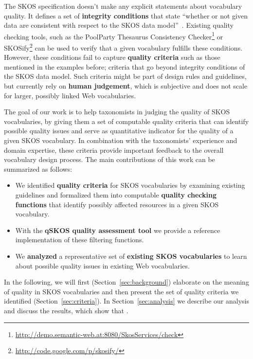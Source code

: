 
The SKOS specification doesn't make any explicit statements about vocabulary quality. It defines a set of \textbf{integrity conditions} that state ``whether or not given data are consistent with respect to the SKOS data model''~\cite{Miles2005}. Existing quality checking tools, such as the PoolParty Thesaurus Consistency Checker\footnote{\url{http://demo.semantic-web.at:8080/SkosServices/check}} or SKOSify\footnote{\url{http://code.google.com/p/skosify/}} can be used to verify that a given vocabulary fulfills these conditions. However, these conditions fail to capture \textbf{quality criteria} such as those mentioned in the examples before; criteria that go beyond integrity conditions of the SKOS data model. Such criteria might be part of design rules and guidelines, but currently rely on \textbf{human judgement}, which is subjective and does not scale for larger, possibly linked Web vocabularies.


The goal of our work is to help taxonomists in judging the quality of SKOS vocabularies, by giving them a set of computable quality criteria that can identify possible quality issues and serve as quantitative indicator for the quality of a given SKOS vocabulary. In combination with the taxonomists' experience and domain expertise, these criteria provide important feedback to the overall vocabulary design process. The main contributions of this work can be summarized as follows:

\begin{itemize}

	\item We identified  \textbf{quality criteria} for SKOS vocabularies by examining existing guidelines and formalized them into computable \textbf{quality checking functions} that identify possibly affected resources in a given SKOS vocabulary.
	
	\item With the \textbf{qSKOS quality assessment tool} we provide a reference implementation of these filtering functions.

	\item We \textbf{analyzed} a representative set of \textbf{existing SKOS vocabularies} to learn about possible quality issues in existing Web vocabularies.

\end{itemize}

In the following, we will first (Section~\ref{sec:background}) elaborate on the meaning of quality in SKOS vocabularies and then present the set of quality criteria we identified (Section~\ref{sec:criteria}). In Section~\ref{sec:analysis} we describe our analysis and discuss the results, which show that .